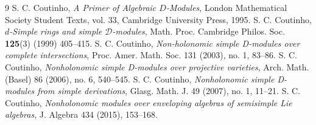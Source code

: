 \documentclass[12pt, a4paper]{amsart}
\begin{document}
\begin{thebibliography}{9}
{\sc S. C. Coutinho},
{\em A Primer of Algebraic $D$-Modules},
London Mathematical Society Student Texts, vol. 33, Cambridge University Press, 1995.%
{\sc S. C. Coutinho},
{\em $d$-Simple rings and simple $\mathscr{D}$-modules},
Math. Proc. Cambridge Philos. Soc. {\bf 125}(3) (1999) 405--415.
{\sc S. C. Coutinho}, {\em Non-holonomic simple D-modules over complete intersections}, Proc. Amer. Math. Soc. 131 (2003), no. 1, 83–86.
{\sc S. C. Coutinho}, {\em Nonholonomic simple D-modules over projective varieties}, Arch. Math. (Basel) 86 (2006), no. 6, 540–545.
{\sc S. C. Coutinho}, {\em Nonholonomic simple D-modules from simple derivations}, Glasg. Math. J. 49 (2007), no. 1, 11–21.
{\sc S. C. Coutinho}, {\em Nonholonomic modules over enveloping algebras of semisimple Lie algebras},
J. Algebra 434 (2015), 153–168.

\end{thebibliography}
\end{document}
